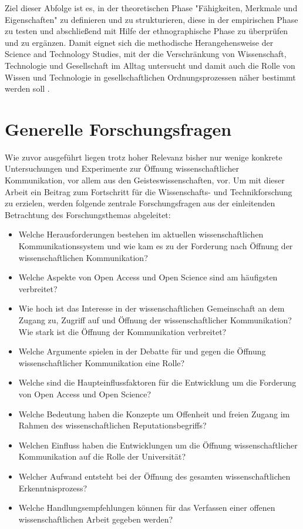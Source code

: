 Ziel dieser Abfolge ist es, in der theoretischen Phase "Fähigkeiten, Merkmale und Eigenschaften" \cite{raab_2012_fragebogen} zu definieren und zu strukturieren, diese in der empirischen Phase zu testen und abschließend mit Hilfe der ethnographische Phase zu überprüfen und zu ergänzen. Damit eignet sich die methodische Herangehensweise der Science and Technology Studies, mit der die Verschränkung von Wissenschaft, Technologie und Gesellschaft im Alltag untersucht und damit auch die Rolle von Wissen und Technologie in gesellschaftlichen Ordnungsprozessen näher bestimmt werden soll \cite{beck_2014_science}.

\section{Generelle Forschungsfragen}

Wie zuvor ausgeführt liegen trotz hoher Relevanz bisher nur wenige konkrete Untersuchungen und Experimente zur Öffnung wissenschaftlicher Kommunikation, vor allem aus den Geisteswissenschaften, vor. Um mit dieser Arbeit ein Beitrag zum Fortschritt für die Wissenschafts- und Technikforschung zu erzielen, werden folgende zentrale Forschungsfragen aus der einleitenden Betrachtung des Forschungsthemas abgeleitet:
\begin{itemize}
\item Welche Herausforderungen bestehen im aktuellen wissenschaftlichen Kommunikationssystem und wie kam es zu der Forderung nach Öffnung der wissenschaftlichen Kommunikation?
\item Welche Aspekte von Open Access und Open Science sind am häufigsten verbreitet?
\item Wie hoch ist das Interesse in der wissenschaftlichen Gemeinschaft an dem Zugang zu, Zugriff auf und Öffnung der wissenschaftlicher Kommunikation? Wie stark ist die Öffnung der Kommunikation verbreitet?
\item Welche Argumente spielen in der Debatte für und gegen die Öffnung wissenschaftlicher Kommunikation eine Rolle?
\item Welche sind die Haupteinflussfaktoren für die Entwicklung um die Forderung von Open Access und Open Science?
\item Welche Bedeutung haben die Konzepte um Offenheit und freien Zugang im Rahmen des wissenschaftlichen Reputationsbegriffs?
\item Welchen Einfluss haben die Entwicklungen um die Öffnung wissenschaftlicher Kommunikation auf die Rolle der Universität?
\item Welcher Aufwand entsteht bei der Öffnung des gesamten wissenschaftlichen Erkenntnisprozess?
\item Welche Handlungsempfehlungen können für das Verfassen einer offenen wissenschaftlichen Arbeit gegeben werden?
\end{itemize}

